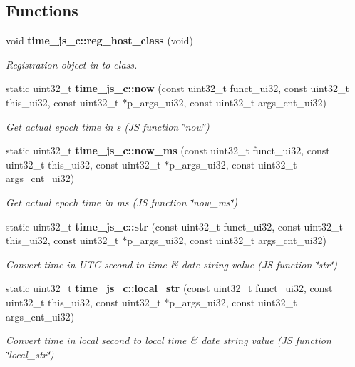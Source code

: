 \subsection*{Functions}
\begin{DoxyCompactItemize}
\item 
void \textbf{ time\+\_\+js\+\_\+c\+::reg\+\_\+host\+\_\+class} (void)
\begin{DoxyCompactList}\small\item\em Registration object in to class. \end{DoxyCompactList}\item 
static uint32\+\_\+t \textbf{ time\+\_\+js\+\_\+c\+::now} (const uint32\+\_\+t funct\+\_\+ui32, const uint32\+\_\+t this\+\_\+ui32, const uint32\+\_\+t $\ast$p\+\_\+args\+\_\+ui32, const uint32\+\_\+t args\+\_\+cnt\+\_\+ui32)
\begin{DoxyCompactList}\small\item\em Get actual epoch time in s (JS function \char`\"{}now\char`\"{}) \end{DoxyCompactList}\item 
static uint32\+\_\+t \textbf{ time\+\_\+js\+\_\+c\+::now\+\_\+ms} (const uint32\+\_\+t funct\+\_\+ui32, const uint32\+\_\+t this\+\_\+ui32, const uint32\+\_\+t $\ast$p\+\_\+args\+\_\+ui32, const uint32\+\_\+t args\+\_\+cnt\+\_\+ui32)
\begin{DoxyCompactList}\small\item\em Get actual epoch time in ms (JS function \char`\"{}now\+\_\+ms\char`\"{}) \end{DoxyCompactList}\item 
static uint32\+\_\+t \textbf{ time\+\_\+js\+\_\+c\+::str} (const uint32\+\_\+t funct\+\_\+ui32, const uint32\+\_\+t this\+\_\+ui32, const uint32\+\_\+t $\ast$p\+\_\+args\+\_\+ui32, const uint32\+\_\+t args\+\_\+cnt\+\_\+ui32)
\begin{DoxyCompactList}\small\item\em Convert time in U\+TC second to time \& date string value (JS function \char`\"{}str\char`\"{}) \end{DoxyCompactList}\item 
static uint32\+\_\+t \textbf{ time\+\_\+js\+\_\+c\+::local\+\_\+str} (const uint32\+\_\+t funct\+\_\+ui32, const uint32\+\_\+t this\+\_\+ui32, const uint32\+\_\+t $\ast$p\+\_\+args\+\_\+ui32, const uint32\+\_\+t args\+\_\+cnt\+\_\+ui32)
\begin{DoxyCompactList}\small\item\em Convert time in local second to local time \& date string value (JS function \char`\"{}local\+\_\+str\char`\"{}) \end{DoxyCompactList}\end{DoxyCompactItemize}


